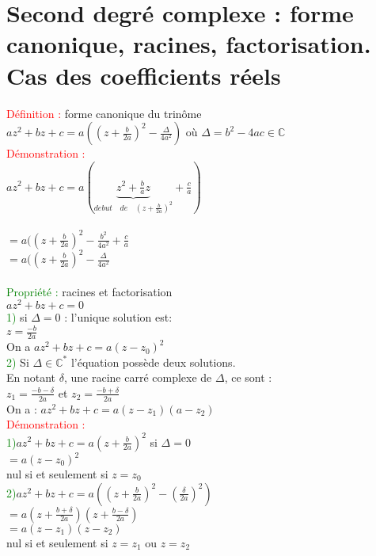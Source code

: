 \documentclass{article}
\begin{document}
\section{Second degré complexe : forme canonique, racines, factorisation. Cas des coefficients réels}
\textcolor{red}{Définition :} forme canonique du trinôme \\
\indent $az^2+bz+c=a((z+\frac{b}{2a})^2-\frac{\Delta}{4a^2})$ où $ \Delta= b^2-4ac \in \mathbb{C}$ \\
\textcolor{red}{Démonstration :} \\
\indent $az^2+bz+c=a(\underbrace{z^2+\frac{b}{a}z}_{debut \quad de \quad (z+\frac{b}{2a})^2}+\frac{c}{a})$ \\ \\
\indent \indent $=a((z+\frac{b}{2a})^2-\frac{b^2}{4a^2}+\frac{c}{a}$ \\
\indent \indent $=a((z+\frac{b}{2a})^2-\frac{\Delta}{4a^2}$ \\ \\
\textcolor{green}{Propriété :} racines et factorisation \\
\indent $az^2+bz+c=0$ \\
\textcolor{green}{1)} si $\Delta=0$ : l'unique solution est: \\
\indent \indent $z=\frac{-b}{2a}$ \\
On a $az^2+bz+c=a(z-z_0)^2$ \\
\textcolor{green}{2)} Si $\Delta \in \mathbb{C}^*$ l'équation possède deux solutions. \\
En notant $\delta$, une racine carré complexe de $\Delta$, ce sont : \\
$z_1=\frac{-b-\delta}{2a}$ et $z_2=\frac{-b+\delta}{2a}$ \\
On a : $az^2+bz+c=a(z-z_1)(a-z_2)$ \\
\textcolor{red}{Démonstration :} \\
\indent \textcolor{green}{1)}$az^2+bz+c=a(z+\frac{b}{2a})^2$ si $\Delta=0$ \\
\indent \indent $=a(z-z_0)^2$ \\
\indent \indent nul si et seulement si $z=z_0$ \\
\indent \textcolor{green}{2)}$az^2+bz+c=a((z+\frac{b}{2a})^2-(\frac{\delta}{2a})^2)$ \\
\indent \indent $=a(z+\frac{b+\delta}{2a})(z+\frac{b-\delta}{2a})$ \\
\indent \indent $=a(z-z_1)(z-z_2)$ \\
\indent \indent nul si et seulement si $z=z_1$ ou $z=z_2$ \\
\end{document}
